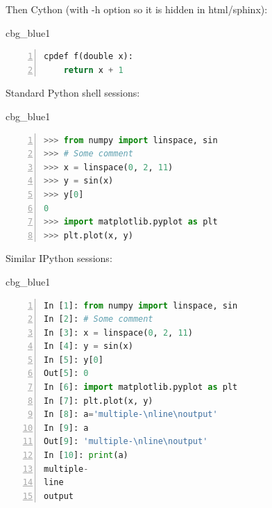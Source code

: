\n\documentclass[%
oneside,                 %
final,                   %
10pt]{article}
\newenvironment{_cod_tight}[1]{
   \def\FrameCommand{\colorbox{#1}}
   \FrameRule0.6pt\MakeFramed {\FrameRestore}\vskip3mm}
   {\vskip0mm\endMakeFramed}
\newenvironment{cod}[1]{
\bgroup\rmfamily
\fboxsep=0mm\relax
\begin{_cod_tight}{#1}
\list{}{\parsep=-2mm\parskip=0mm\topsep=0pt\leftmargin=2mm
\rightmargin=2\leftmargin\leftmargin=4pt\relax}
\item\relax}
{\endlist\end{_cod_tight}\egroup}
\theoremstyle{definition}
\begin{document}
Then Cython (with -h option so it is hidden in html/sphinx):




\begin{cod}{cbg_blue1}\begin{lstlisting}[language=Python,style=myspeciallststyle,numbers=left,numberstyle=\tiny,stepnumber=3,numbersep=15pt,xleftmargin=1mm]
cpdef f(double x):
    return x + 1

\end{lstlisting}\end{cod}
\noindent


Standard Python shell sessions:










\begin{cod}{cbg_blue1}\begin{lstlisting}[language=python,style=myspeciallststyle,numbers=left,numberstyle=\tiny,stepnumber=3,numbersep=15pt,xleftmargin=1mm]
>>> from numpy import linspace, sin
>>> # Some comment
>>> x = linspace(0, 2, 11)
>>> y = sin(x)
>>> y[0]
0
>>> import matplotlib.pyplot as plt
>>> plt.plot(x, y)

\end{lstlisting}\end{cod}
\noindent


Similar IPython sessions:

















\begin{cod}{cbg_blue1}\begin{lstlisting}[language=python,style=myspeciallststyle,numbers=left,numberstyle=\tiny,stepnumber=3,numbersep=15pt,xleftmargin=1mm]
In [1]: from numpy import linspace, sin
In [2]: # Some comment
In [3]: x = linspace(0, 2, 11)
In [4]: y = sin(x)
In [5]: y[0]
Out[5]: 0
In [6]: import matplotlib.pyplot as plt
In [7]: plt.plot(x, y)
In [8]: a='multiple-\nline\noutput'
In [9]: a
Out[9]: 'multiple-\nline\noutput'
In [10]: print(a)
multiple-
line
output

\end{lstlisting}\end{cod}
\noindent
\end{document}
